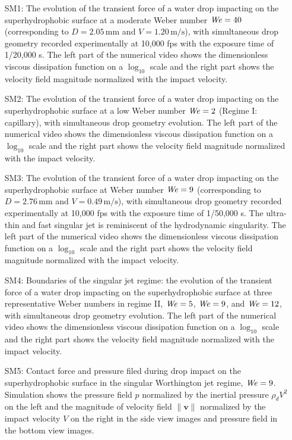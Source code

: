 \begin{subappendices}
	\begin{enumerate}
		\item[SM1:] The evolution of the transient force of a water drop impacting on the superhydrophobic surface at a moderate Weber number $\mathit{We} = 40$ (corresponding to $D = 2.05\,\si{\milli\meter}$ and $V = 1.20\,\si{\meter}/\si{\second}$), with simultaneous drop geometry recorded experimentally at 10,000 fps with the exposure time of 1/20,000 s. The left part of the numerical video shows the dimensionless viscous dissipation function on a $\log_{10}$ scale and the right part shows the velocity field magnitude normalized with the impact velocity.
		\item[SM2:] The evolution of the transient force of a water drop impacting on the superhydrophobic surface at a low Weber number $\mathit{We} = 2$ (Regime I: capillary), with simultaneous drop geometry evolution. The left part of the numerical video shows the dimensionless viscous dissipation function on a $\log_{10}$ scale and the right part shows the velocity field magnitude normalized with the impact velocity.
		\item[SM3:] The evolution of the transient force of a water drop impacting on the superhydrophobic surface at Weber number $\mathit{We} = 9$ (corresponding to $D = 2.76\,\si{\milli\meter}$ and $V = 0.49\,\si{\meter}/\si{\second}$), with simultaneous drop geometry recorded experimentally at 10,000 fps with the exposure time of 1/50,000 s. The ultra-thin and fast singular jet is reminiscent of the hydrodynamic singularity. The left part of the numerical video shows the dimensionless viscous dissipation function on a $\log_{10}$ scale and the right part shows the velocity field magnitude normalized with the impact velocity.
		\item[SM4:] Boundaries of the singular jet regime: the evolution of the transient force of a water drop impacting on the superhydrophobic surface at three representative Weber numbers in regime II, $\mathit{We} = 5$, $\mathit{We} = 9$, and $\mathit{We} = 12$, with simultaneous drop geometry evolution. The left part of the numerical video shows the dimensionless viscous dissipation function on a $\log_{10}$ scale and the right part shows the velocity field magnitude normalized with the impact velocity.
		\item[SM5:] Contact force and pressure filed during drop impact on the superhydrophobic surface in the singular Worthington jet regime, $\mathit{We} = 9$. Simulation shows the pressure field $p$ normalized by the inertial pressure $\rho_dV^2$ on the left and the magnitude of velocity field $\|\boldsymbol{v}\|$ normalized by the impact velocity $V$ on the right in the side view images and pressure field in the bottom view images.

\end{enumerate}
\end{subappendices}
